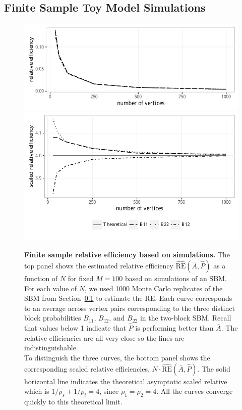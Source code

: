 \documentclass[10pt,letterpaper]{article}
\renewcommand{\hat}{\widehat}
\begin{document}
\subsection{Finite Sample Toy Model Simulations}\label{sec:sbm_sim}


\begin{figure}[!htbp]
    \centering
    \includegraphics[width=1\textwidth]{RE.pdf}
    \includegraphics[width=1\textwidth]{scaled_RE.pdf}
    \caption{{\bf Finite sample relative efficiency based on simulations. }
    The top panel shows the estimated relative efficiency $\hat{\mathrm{RE}}(\bar{A},\hat{P})$ as a function of $N$ for fixed $M=100$ based on simulations of an SBM. 
    For each value of $N$, we used 1000 Monte Carlo replicates of the SBM from Section~\ref{sec:sbm_sim} to estimate the RE.
    Each curve corresponds to an average across vertex pairs corresponding to the three distinct block probabilities $B_{11}$, $B_{12}$, and $B_{22}$ in the two-block SBM.
    Recall that values below 1 indicate that $\hat{P}$ is performing better than $\bar{A}$.
    The relative efficiencies are all very close so the lines are indistinguishable. \\
    To distinguish the three curves, the bottom panel shows the corresponding scaled relative efficiencies, $N\cdot \hat{\mathrm{RE}}(\bar{A},\hat{P})$.
    The solid horizontal line indicates the theoretical asymptotic scaled relative which is  $1/\rho_s+1/\rho_t=4$, since $\rho_1=\rho_2=4$.
    All the curves converge quickly to this theoretical limit. }
    \label{fig:RE}
\end{figure}
\end{document}
